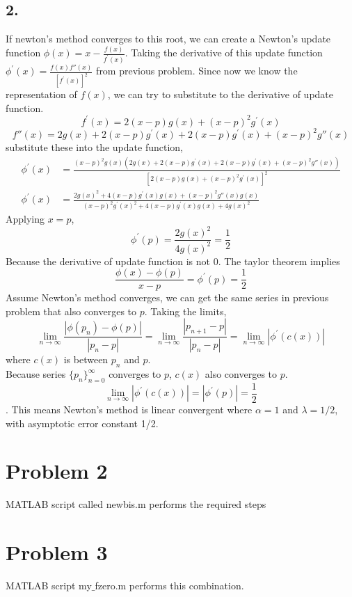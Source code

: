 \documentclass{article}
\begin{document}
\subsection*{2.}
If newton's method converges to this root, we can create a Newton's update function $\phi(x) = x - \frac{f(x)}{f^\prime(x)}$.
Taking the derivative of this update function $\phi^\prime(x) = \frac{f(x)f''(x)}{[f^\prime(x)]^2}$ from previous problem.
Since now we know the representation of $f(x)$, we can try to substitute to the derivative of update function.
\\
$$f^\prime(x) = 2(x-p)g(x) + (x-p)^2g^\prime(x)$$
$$f''(x) = 2g(x) + 2(x-p)g^\prime(x) + 2(x-p)g^\prime(x) + (x-p)^2g''(x)$$
substitute these into the update function,
\begin{align}
  \phi^\prime(x) &= \frac{(x-p)^2g(x)( 2g(x) + 2(x-p)g^\prime(x) + 2(x-p)g^\prime(x) + (x-p)^2g''(x) )}{[2(x-p)g(x) + (x-p)^2g^\prime(x)]^2} \nonumber \\
  \phi^\prime(x) &= \frac{2g(x)^2 + 4(x-p)g^\prime(x)g(x) + (x-p)^2g''(x)g(x)}{(x-p)^2g^\prime(x)^2 + 4(x-p)g^\prime(x)g(x) + 4g(x)^2}\nonumber
\end{align}
Applying $x = p$,
$$\phi^\prime(p) = \frac{2g(x)^2}{4g(x)^2} = \frac{1}{2}$$
Because the derivative of update function is not $0$. The taylor theorem implies
$$\frac{\phi(x) - \phi(p)}{x -p} = \phi^\prime(p) = \frac{1}{2}$$
Assume Newton's method converges, we can get the same series in previous problem that also converges to $p$. Taking the limits,
$$\lim_{n \rightarrow \infty}\frac{|\phi(p_n) - \phi(p)|}{|p_n-p|}=\lim_{n \rightarrow \infty}\frac{|p_{n+1} - p|}{|p_n-p|} = \lim_{n \rightarrow \infty}|\phi^\prime(c(x))|$$
where $c(x)$ is between $p_n$ and $p$. 
\\
Because series $\{p_n\}^\infty_{n=0}$ converges to $p$, $c(x)$ also converges to $p$.
$$\lim_{n \rightarrow \infty}|\phi^\prime(c(x))| = |\phi^\prime(p)| = \frac{1}{2}$$.
This means Newton's method is linear convergent where $\alpha = 1$ and $\lambda = 1/2$, with asymptotic error constant 1/2.


\section*{Problem 2}
MATLAB script called newbis.m performs the required steps

\section*{Problem 3}
MATLAB script my$\_$fzero.m performs this combination.
\end{document}
